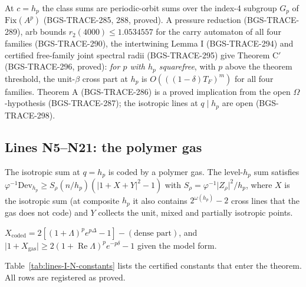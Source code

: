 At \(c=h_p\) the class sums are periodic-orbit sums over the index-4 subgroup \(G_p\) of \(\mathrm{Fix}(A^p)\) (BGS-TRACE-285, 288, proved). A pressure reduction (BGS-TRACE-289), arb bounds \(r_2(4000)\le1.0534557\) for the carry automaton of all four families (BGS-TRACE-290), the intertwining Lemma I (BGS-TRACE-294) and certified free-family joint spectral radii (BGS-TRACE-295) give Theorem C\('\) (BGS-TRACE-296, proved): \emph{for \(p\) with \(h_p\) squarefree}, with \(p\) above the theorem threshold, the unit-\(\beta\) cross part at \(h_p\) is \(O(((1-\delta)T_F)^m)\) for all four families. Theorem A (BGS-TRACE-286) is a proved implication from the open \(\Omega\)-hypothesis (BGS-TRACE-287); the isotropic lines at \(q\mid h_p\) are open (BGS-TRACE-298).

\subsection{Lines N5--N21: the polymer gas}
\label{sec:lines-I-N-gas}
The isotropic sum at \(q=h_p\) is coded by a polymer gas. The level-\(h_p\) sum satisfies \(\varphi^{-1}\mathrm{Dev}_{h_p}\ge S_\rho(n/h_p)(\lvert1+X+Y\rvert^2-1)\) with \(S_\rho=\varphi^{-1}\lvert Z_\rho\rvert^2/h_p\), where \(X\) is the isotropic sum (at composite \(h_p\) it also contains \(2^{\omega(h_p)}-2\) cross lines that the gas does not code) and \(Y\) collects the unit, mixed and partially isotropic points.
\begin{lemma}
\(X_{\mathrm{coded}}=2[(1+\Lambda)^pe^{p\Delta}-1]-(\text{dense part})\), and \(\lvert1+X_{\mathrm{gas}}\rvert\ge2(1+\operatorname{Re}\Lambda)^pe^{-p\delta}-1\) given the model form.
\end{lemma}
Table~\ref{tab:lines-I-N-constants} lists the certified constants that enter the theorem. All rows are registered as proved.
